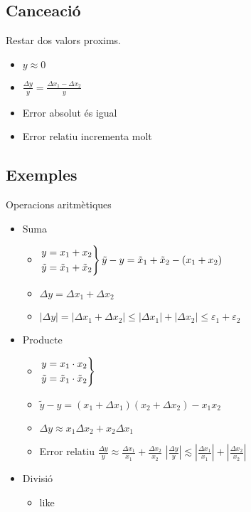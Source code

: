 \documentclass{article}
\begin{document}
\subsection{Cance\lgem ació}
Restar dos valors proxims.
\begin{itemize}
\item $y \approx 0$
\item $\frac{\Delta y}{y} = \frac{\Delta x_1 - \Delta x_2}{y}$
\item Error absolut és igual
\item Error relatiu incrementa molt
\end{itemize}

\subsection{Exemples}
Operacions aritmètiques
\begin{itemize}
\item Suma
	\begin{itemize}
	\item
		$
		\begin{rcases}
		y = x_1 + x_2\\
		\tilde y = \tilde x_1 + \tilde x_2
		\end{rcases}
		\tilde y - y = \tilde x_1 + \tilde x_2 - (x_1 + x_2)
		$
	\item $\Delta y = \Delta x_1 + \Delta x_2$
	\item $|\Delta y| = |\Delta x_1 + \Delta x_2| \le |\Delta x_1| + |\Delta x_2| \le \varepsilon_1 + \varepsilon_2$
	\end{itemize}

\item Producte
	\begin{itemize}
	\item
		$
		\begin{rcases}
		y = x_1 \cdot x_2\\
		\tilde y = \tilde x_1 \cdot \tilde x_2
		\end{rcases}
		$
	\item $\tilde y - y = (x_1 + \Delta x_1)(x_2 + \Delta x_2) - x_1 x_2$
	\item $\Delta y \approx x_1 \Delta x_2 + x_2 \Delta x_1$
	\item Error relatiu
		\subitem $\frac{\Delta y}{y} \approx \frac{\Delta x_1}{x_1} + \frac{\Delta x_2}{x_2}$
		\subitem $|\frac{\Delta y}{y}| \lesssim |\frac{\Delta x_1}{x_1}| + |\frac{\Delta x_2}{x_2}|$
	\end{itemize}

\item Divisió
	\begin{itemize}
	\item like
	\end{itemize}
\end{itemize}
\end{document}
